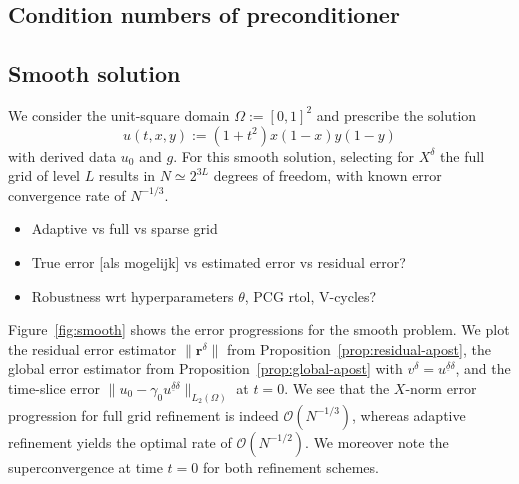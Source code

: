 \documentclass[11pt,a4paper,oneside,english]{amsart}
\numberwithin{equation}{section}
\numberwithin{theorem}{section}
\theoremstyle{definition}
\newcommand{\udelta}{{\underline{\delta}}}
\newcommand{\jw}[1]{{\color{red}{JW: #1}}}
\begin{document}
\subsection{Condition numbers of preconditioner}
\subsection{Smooth solution}
We consider the unit-square domain $\Omega := [0,1]^2$ and prescribe the solution
\[
  u(t,x,y) := (1 + t^2) x (1-x) y (1-y)
\]
with derived data $u_0$ and $g$. For this smooth solution, selecting for $X^\delta$
the full grid of level $L$ results in $N \simeq 2^{3L}$ degrees of freedom, with
known error convergence rate of $N^{-1/3}$.\jw{citatie}
\begin{itemize}
  \item Adaptive vs full vs sparse grid \jw{ik kreeg de non-adapt sparse grid niet aan de praat}
  \item True error [als mogelijk] vs estimated error vs residual error?
  \item Robustness wrt hyperparameters $\theta$, PCG rtol, V-cycles?
\end{itemize}

Figure~\ref{fig:smooth} shows the error progressions for the smooth problem. We
plot the residual error estimator $\|\mathbf r^{\delta}\|$ from Proposition~\ref{prop:residual-apost},
the global error estimator from Proposition~\ref{prop:global-apost} with $v^\delta=u^{\udelta \delta}$,
and the time-slice error $\|u_0 - \gamma_0 u^{\udelta \delta}\|_{L_2(\Omega)}$ at $t=0$.\jw{misschien ook de $X$-norm meten?}
We see that the $X$-norm error progression for full grid refinement is indeed $\mathcal O(N^{-1/3})$,
whereas adaptive refinement yields the optimal\jw{cite} rate of $\mathcal O(N^{-1/2})$.
We moreover note the superconvergence at time $t=0$ for both refinement schemes.
\end{document}
